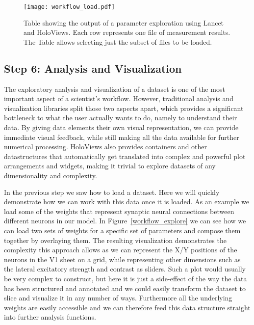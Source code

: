 \begin{figure}
	\centering
        \texttt{[image: workflow\_load.pdf]}
	    \caption[Table summarizing results from parameter analysis in
          Lancet and HoloViews.]{Table showing the output of a
          parameter exploration using Lancet and HoloViews. Each row
          represents one file of measurement results. The Table allows
          selecting just the subset of files to be loaded.}
	\label{workflow_load}
\end{figure}


\subsection{Step 6: Analysis and Visualization}

The exploratory analysis and visualization of a dataset is one of the
most important aspect of a scientist's workflow. However, traditional
analysis and visualization libraries split those two aspects apart,
which provides a significant bottleneck to what the user actually
wants to do, namely to understand their data. By giving data elements
their own visual representation, we can provide immediate visual
feedback, while still making all the data available for further
numerical processing. HoloViews also provides containers and other
datastructures that automatically get translated into complex and powerful plot
arrangements and widgets, making it trivial to explore datasets of any
dimensionality and complexity.

In the previous step we saw how to load a dataset.  Here we will
quickly demonstrate how we can work with this data once it is loaded.
As an example we load some of the weights that represent synaptic
neural connections between different neurons in our model. In
Figure~\ref{workflow_explore} we can see how we can load two sets of
weights for a specific set of parameters and compose them together by
overlaying them. The resulting visualization demonstrates the
complexity this approach allows as we can represent the X/Y positions
of the neurons in the V1 sheet on a grid, while representing other
dimensions such as the lateral excitatory strength and contrast as
sliders. Such a plot would usually be very complex to construct, but
here it is just a side-effect of the way the data has been structured
and annotated and we could easily transform the dataset to slice and
visualize it in any number of ways. Furthermore all the underlying
weights are easily accessible and we can therefore feed this data
structure straight into further analysis functions.

